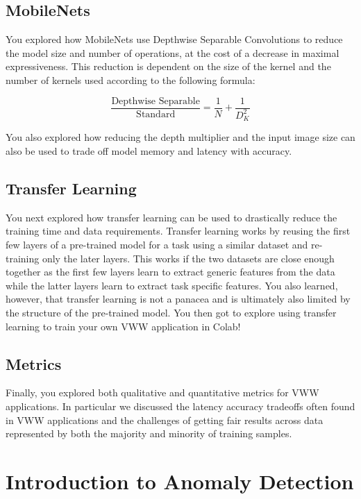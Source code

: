   \subsection{MobileNets}
  
  You explored how MobileNets use Depthwise Separable Convolutions to reduce the model size and number of operations, at the cost of a decrease in maximal expressiveness. This reduction is dependent on the size of the kernel and the number of kernels used according to the following formula:
  
$$  \frac{\text{Depthwise Separable}}{\text{Standard}} = \frac{1}{N} + \frac{1}{D_K^2}$$
  
  You also explored how reducing the depth multiplier and the input image size can also be used to trade off model memory and latency with accuracy.
  
  \subsection{Transfer Learning}
  
  You next explored how transfer learning can be used to drastically reduce the training time and data requirements. Transfer learning works by reusing the first few layers of a pre-trained model for a task using a similar dataset and re-training only the later layers. This works if the two datasets are close enough together as the first few layers learn to extract generic features from the data while the latter layers learn to extract task specific features. You also learned, however, that transfer learning is not a panacea and is ultimately also limited by the structure of the pre-trained model. You then got to explore using transfer learning to train your own VWW application in Colab!
  
  \subsection{Metrics}
  
  Finally, you explored both qualitative and quantitative metrics for VWW applications. In particular we discussed the latency accuracy tradeoffs often found in VWW applications and the challenges of getting fair results across data represented by both the majority and minority of training samples.
  
  
  
  \section{Introduction to Anomaly Detection}
  
